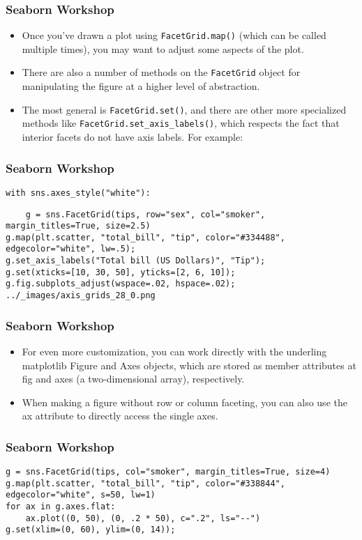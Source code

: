 \documentclass{beamer}
\begin{document}
\begin{frame}[fragile]
\frametitle{Seaborn Workshop}
\large
\begin{itemize}
\item Once you’ve drawn a plot using \texttt{FacetGrid.map()} (which can be called multiple times), you may want to adjust some aspects of the plot. 
\item There are also a number of methods on the \texttt{FacetGrid} object for manipulating the figure at a higher level of abstraction. \item The most general is \texttt{FacetGrid.set()}, and there are other more specialized methods like \texttt{FacetGrid.set\_axis\_labels()}, which respects the fact that interior facets do not have axis labels. For example:
\end{itemize}

\end{frame}
\begin{frame}[fragile]
\frametitle{Seaborn Workshop}
\large
\begin{verbatim}
with sns.axes_style("white"):
\end{verbatim}

\begin{verbatim}
    g = sns.FacetGrid(tips, row="sex", col="smoker", margin_titles=True, size=2.5)
g.map(plt.scatter, "total_bill", "tip", color="#334488", edgecolor="white", lw=.5);
g.set_axis_labels("Total bill (US Dollars)", "Tip");
g.set(xticks=[10, 30, 50], yticks=[2, 6, 10]);
g.fig.subplots_adjust(wspace=.02, hspace=.02);
../_images/axis_grids_28_0.png
\end{verbatim}

\end{frame}
\begin{frame}[fragile]
\frametitle{Seaborn Workshop}
\large
\begin{itemize}
\item For even more customization, you can work directly with the underling matplotlib Figure and Axes objects, which are stored as member attributes at fig and axes (a two-dimensional array), respectively. 
\item When making a figure without row or column faceting, you can also use the ax attribute to directly access the single axes.
\end{itemize}


\end{frame}
\begin{frame}[fragile]
\frametitle{Seaborn Workshop}
\large
\begin{verbatim}
g = sns.FacetGrid(tips, col="smoker", margin_titles=True, size=4)
g.map(plt.scatter, "total_bill", "tip", color="#338844", edgecolor="white", s=50, lw=1)
for ax in g.axes.flat:
    ax.plot((0, 50), (0, .2 * 50), c=".2", ls="--")
g.set(xlim=(0, 60), ylim=(0, 14));
\end{verbatim}

\end{frame}
\end{document}
